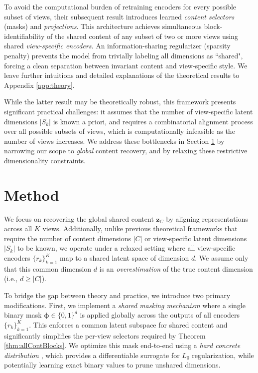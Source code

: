 \documentclass[a4paper,12pt]{article}
\begin{document}
To avoid the computational burden of retraining encoders for every possible subset of views, their subsequent result introduces learned \textit{content selectors} (masks) and \textit{projections}. This architecture achieves simultaneous block-identifiability of the shared content of any subset of two or more views using shared \textit{view-specific encoders}. An information-sharing regularizer (sparsity penalty) prevents the model from trivially labeling all dimensions as ``shared", forcing a clean separation between invariant content and view-specific style. We leave further intuitions and detailed explanations of the theoretical results to Appendix \ref{app:theory}.

While the latter result may be theoretically robust, this framework presents significant practical challenges: it assumes that the number of view-specific latent dimensions $|S_k|$ is known a priori, and requires a combinatorial alignment process over all possible subsets of views, which is computationally infeasible as the number of views increases. We address these bottlenecks in Section \ref{sec:method} by narrowing our scope to \textit{global} content recovery, and by relaxing these restrictive dimensionality constraints.

\section{Method}
\label{sec:method}
We focus on recovering the global shared content $\mathbf{z}_C$ by aligning representations across all $K$ views. Additionally, unlike previous theoretical frameworks that require the number of content dimensions $|C|$ or view-specific latent dimensions $|S_{k}|$ to be known, we operate under a relaxed setting where all view-specific encoders $\{ r_k \}_{k=1}^{K}$ map to a shared latent space of dimension $d$. We assume only that this common dimension $d$ is an \textit{overestimation} of the true content dimension (i.e., $d \ge |C|$).

To bridge the gap between theory and practice, we introduce two primary modifications. First, we implement a \textit{shared masking mechanism} where a single binary mask $\mathbf{\phi} \in \{0, 1\}^d$ is applied globally across the outputs of all encoders $\{r_k\}_{k=1}^K$. This enforces a common latent subspace for shared content and significantly simplifies the per-view selectors required by Theorem \ref{thm:allContBlocks}. We optimize this mask end-to-end using a \textit{hard concrete distribution} \cite{louizos2018learningsparseneuralnetworks}, which provides a differentiable surrogate for $L_0$ regularization, while potentially learning exact binary values to prune unshared dimensions.
\end{document}

